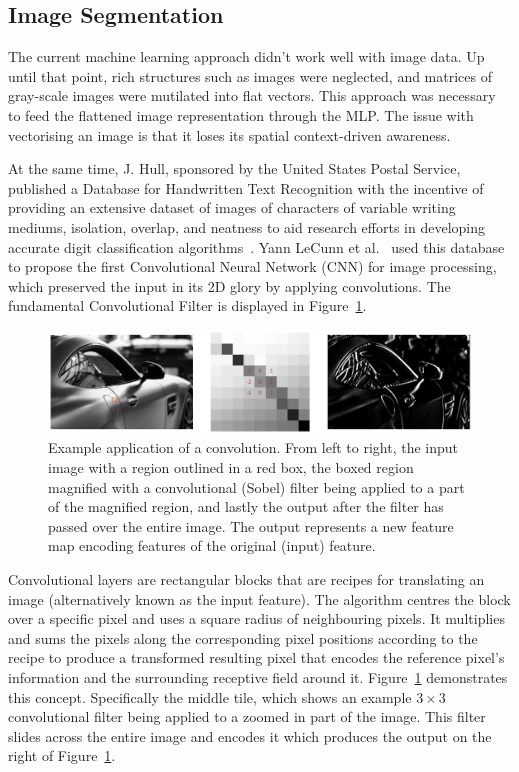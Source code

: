\documentclass[12pt,twoside]{report}
\begin{document}
\subsection{Image Segmentation}\label{sect:image-segmentation}

The current machine learning approach didn't work well with image data. Up until that point, rich structures such as images were neglected, and matrices of gray-scale images were mutilated into flat vectors. This approach was necessary to feed the flattened image representation through the MLP. The issue with vectorising an image is that it loses its spatial context-driven awareness. 

At the same time, J. Hull, sponsored by the United States Postal Service, published a Database for Handwritten Text Recognition with the incentive of providing an extensive dataset of images of characters of variable writing mediums, isolation, overlap, and neatness to aid research efforts in developing accurate digit classification algorithms~\cite{JJHull1994}. Yann LeCunn et al.~\cite{Lenet1998} used this database to propose the first Convolutional Neural Network (CNN) for image processing, which preserved the input in its 2D glory by applying convolutions. The fundamental Convolutional Filter is displayed in Figure~\ref{fig:sobel}.

\begin{figure}[H]
  \centering
  \includegraphics[width=1\linewidth]{../figures/sobel.png}
  \caption{Example application of a convolution. From left to right, the input image with a region outlined in a red box, the boxed region magnified with a convolutional (Sobel) filter being applied to a part of the magnified region, and lastly the output after the filter has passed over the entire image. The output represents a new feature map encoding features of the original (input) feature.}\label{fig:sobel}
\end{figure}

Convolutional layers are rectangular blocks that are recipes for translating an image (alternatively known as the input feature). The algorithm centres the block over a specific pixel and uses a square radius of neighbouring pixels. It multiplies and sums the pixels along the corresponding pixel positions according to the recipe to produce a transformed resulting pixel that encodes the reference pixel's information and the surrounding receptive field around it. Figure~\ref{fig:sobel} demonstrates this concept. Specifically the middle tile, which shows an example $3 \times 3$ convolutional filter being applied to a zoomed in part of the image. This filter slides across the entire image and encodes it which produces the output on the right of Figure~\ref{fig:sobel}. 
\end{document}
